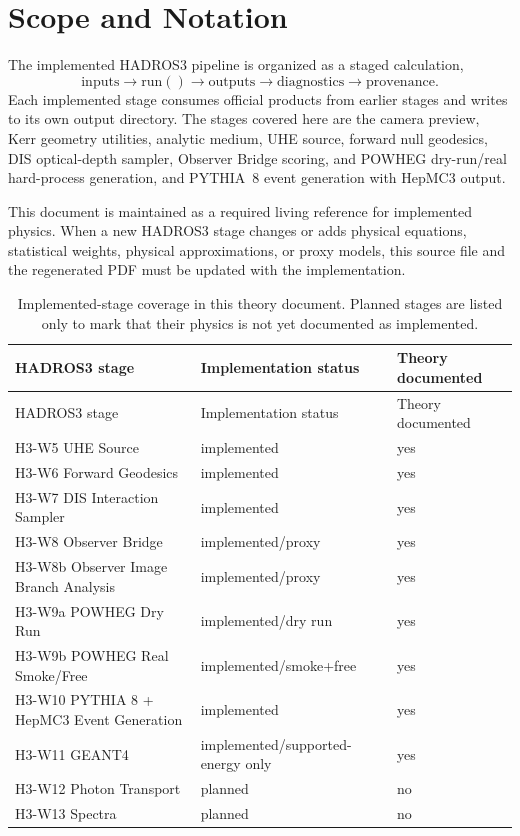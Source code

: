 \documentclass[11pt,a4paper]{report}
\numberwithin{equation}{chapter}
\begin{document}
\clearpage
\tableofcontents

\chapter*{Scope and Notation}

The implemented HADROS3 pipeline is organized as a staged calculation,
\begin{equation}
\mathrm{inputs}\rightarrow \mathrm{run}()\rightarrow
\mathrm{outputs}\rightarrow \mathrm{diagnostics}\rightarrow
\mathrm{provenance}.
\end{equation}
Each implemented stage consumes official products from earlier stages and
writes to its own output directory. The stages covered here are the camera
preview, Kerr geometry utilities, analytic medium, UHE source, forward null
geodesics, DIS optical-depth sampler, Observer Bridge scoring, and POWHEG
dry-run/real hard-process generation, and PYTHIA~8 event generation with
HepMC3 output.

This document is maintained as a required living reference for implemented
physics. When a new HADROS3 stage changes or adds physical equations,
statistical weights, physical approximations, or proxy models, this source file
and the regenerated PDF must be updated with the implementation.

\begin{longtable}{>{\raggedright\arraybackslash}p{}
                  >{\raggedright\arraybackslash}p{}
                  >{\raggedright\arraybackslash}p{}}
\caption{Implemented-stage coverage in this theory document. Planned stages are
listed only to mark that their physics is not yet documented as implemented.}\\
\toprule
HADROS3 stage & Implementation status & Theory documented \\
\midrule
\endfirsthead
\toprule
HADROS3 stage & Implementation status & Theory documented \\
\midrule
\endhead
H3-W5 UHE Source & implemented & yes \\
H3-W6 Forward Geodesics & implemented & yes \\
H3-W7 DIS Interaction Sampler & implemented & yes \\
H3-W8 Observer Bridge & implemented/proxy & yes \\
H3-W8b Observer Image Branch Analysis & implemented/proxy & yes \\
H3-W9a POWHEG Dry Run & implemented/dry run & yes \\
H3-W9b POWHEG Real Smoke/Free & implemented/smoke+free & yes \\
H3-W10 PYTHIA 8 + HepMC3 Event Generation & implemented & yes \\
H3-W11 GEANT4 & implemented/supported-energy only & yes \\
H3-W12 Photon Transport & planned & no \\
H3-W13 Spectra & planned & no \\
\bottomrule
\end{longtable}
\end{document}
